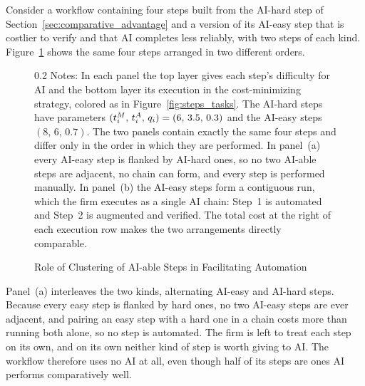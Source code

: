 \begin{example}
\label{ex:fragmentation}
Consider a workflow containing four steps built from the AI-hard step of Section~\ref{sec:comparative_advantage} and a version of its AI-easy step that is costlier to verify and that AI completes less reliably, with two steps of each kind.
Figure~\ref{fig:ex_fragmentation} shows the same four steps arranged in two different orders.
\begin{figure}[!t]
\caption{Role of Clustering of AI-able Steps in Facilitating Automation}
\label{fig:ex_fragmentation}
\centering
\begin{minipage}{\linewidth}
  \centering
  
\end{minipage}
\par\vspace{1.6em}
\begin{minipage}{\linewidth}
  \centering
  
\end{minipage}
\par\vspace{\fignotesskip}
\begin{minipage}{1\linewidth}
\begin{spacing}{0.2}
{\fontsize{9.5pt}{10pt}\selectfont Notes: In each panel the top layer gives each step's difficulty for AI and the bottom layer its execution in the cost-minimizing strategy, colored as in Figure~\ref{fig:steps_tasks}. The AI-hard steps have parameters $(t^{M}_{i},\, t^{A}_{i},\, q_i) = (6,\,3.5,\,0.3)$ and the AI-easy steps $(8,\,6,\,0.7)$. The two panels contain exactly the same four steps and differ only in the order in which they are performed. In panel~(a) every AI-easy step is flanked by AI-hard ones, so no two AI-able steps are adjacent, no chain can form, and every step is performed manually. In panel~(b) the AI-easy steps form a contiguous run, which the firm executes as a single AI chain: Step~1 is automated and Step~2 is augmented and verified. The total cost at the right of each execution row makes the two arrangements directly comparable.}
\end{spacing}
\end{minipage}
\end{figure}

Panel~(a) interleaves the two kinds, alternating AI-easy and AI-hard steps.
Because every easy step is flanked by hard ones, no two AI-easy steps are ever adjacent, and pairing an easy step with a hard one in a chain costs more than running both alone, so no step is automated.
The firm is left to treat each step on its own, and on its own neither kind of step is worth giving to AI.
The workflow therefore uses no AI at all, even though half of its steps are ones AI performs comparatively well.


\end{example}
